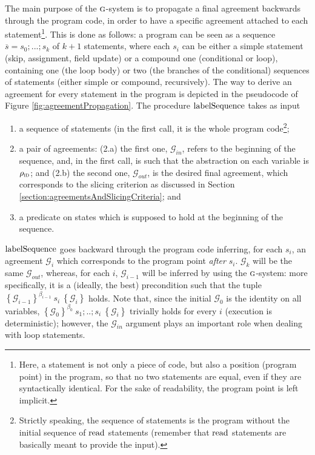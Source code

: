 \documentclass[prodmode,acmtocl]{acmsmall}
\def\uco{\ensuremath{\rho}\xspace}
\newcommand{\0}{\mbox{\bf 0}}
\newcommand{\CODE}[1]{\ensuremath{\mbox{\lstinline!#1!}\xspace}\xspace}
\def\IDDOM{\ensuremath{\uco_{\textsc{id}}}\xspace}
\def\PRED{\beta}
\def\AGREEM{\mathcal{G}}
\newcommand{\RULENAME}[1]{\textsc{#1}}
\newcommand{\GSMTH}[1]{$\RULENAME{g}$-#1}
\def\GSYSTEM{\GSMTH{system}\xspace}
\newcommand{\TRIPLEB}[4]{\left\{#1\right\}^{#2}\ #3\ \left\{#4\right\}}
\begin{document}
The main purpose of the \GSYSTEM is to propagate a final agreement
backwards through the program code, in order to have a specific
agreement attached to each statement\footnote{Here, a statement is not
  only a piece of code, but also a position (program point) in the
  program, so that no two statements are equal, even if they are
  syntactically identical.  For the sake of readability, the program
  point is left implicit.}.  This is done as follows: a program can be
seen as a sequence $\overline{s} = s_0;...;s_k$ of $k+1$ statements,
where each $s_i$ can be either a simple statement (skip, assignment,
field update) or a compound one (conditional or loop), containing one
(the loop body) or two (the branches of the conditional) sequences of
statements (either simple or compound, recursively).  The way to
derive an agreement for every statement in the program is depicted in
the pseudocode of Figure \ref{fig:agreementPropagation}.  The
procedure \CODE{labelSequence} takes as input
\begin{enumerate}
\item a sequence of statements (in the first call, it is the whole
  program code\footnote{Strictly speaking, the sequence of statements
    is the program without the initial sequence of \CODE{read}
    statements (remember that \CODE{read} statements are basically
    meant to provide the input).};
\item a pair of agreements: (2.a) the first one, $\AGREEM_{in}$, refers
  to the beginning of the sequence, and, in the first call, is such
  that the abstraction on each variable is $\IDDOM$; and (2.b) the
  second one, $\AGREEM_{out}$, is the desired final agreement, which
  corresponds to the slicing criterion as discussed in Section
  \ref{section:agreementsAndSlicingCriteria}; and
\item a predicate on states which is supposed to hold at the beginning
  of the sequence.
\end{enumerate}
\CODE{labelSequence} goes backward through the program code inferring,
for each $s_i$, an agreement $\AGREEM_i$ which corresponds to the
program point \emph{after} $s_i$.  $\AGREEM_k$ will be the same
$\AGREEM_{out}$, whereas, for each $i$, $\AGREEM_{i-1}$ will be
inferred by using the \GSYSTEM: more specifically, it is a (ideally,
the best) precondition such that the tuple
$\TRIPLEB{\AGREEM_{i-1}}{\PRED_{i-1}}{s_i}{\AGREEM_i}$ holds.  Note
that, since the initial $\AGREEM_0$ is the identity on all variables,
$\TRIPLEB{\AGREEM_{0}}{\PRED_{0}}{s_1;..;s_i}{\AGREEM_i}$ trivially
holds for every $i$ (execution is deterministic); however, the
$\AGREEM_{in}$ argument plays an important role when dealing with loop
statements.
\end{document}
